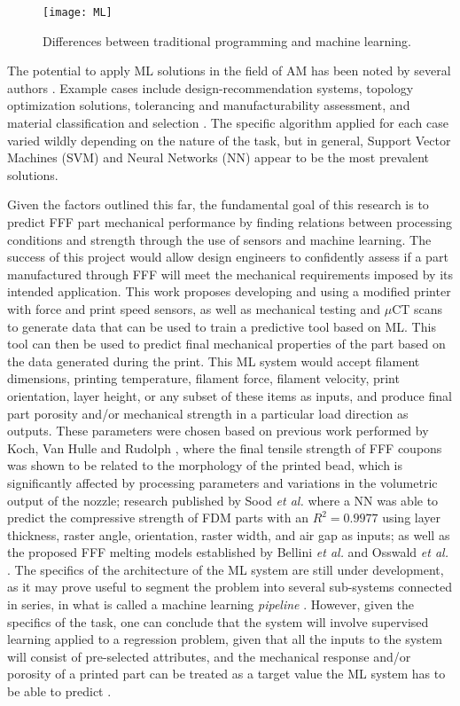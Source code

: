 \documentclass[main.tex]{subfiles}
\begin{document}
\begin{figure}[!htbp]
	\center
	\texttt{[image: ML]}
	\caption{Differences between traditional programming and machine learning. \cite{Chollet2018}} \label{fig:MLvsP}
\end{figure}

The potential to apply ML solutions in the field of AM has been noted by several authors \cite{Razvi2019,Meng2020}. Example cases include design-recommendation systems, topology optimization solutions, tolerancing and manufacturability assessment, and material classification and selection \cite{Razvi2019}. The specific algorithm applied for each case varied wildly depending on the nature of the task, but in general, Support Vector Machines (SVM) and Neural Networks (NN) appear to be the most prevalent solutions.

Given the factors outlined this far, the fundamental goal of this research is to predict FFF part mechanical performance by finding relations between processing conditions and strength through the use of sensors and machine learning. The success of this project would allow design engineers to confidently assess if a part manufactured through FFF will meet the mechanical requirements imposed by its intended application. This work proposes developing and using a modified printer with force and print speed sensors, as well as mechanical testing and $\mu$CT scans to generate data that can be used to train a predictive tool based on ML. This tool can then be used to predict final mechanical properties of the part based on the data generated during the print. This ML system would accept filament dimensions, printing temperature, filament force, filament velocity, print orientation, layer height, or any subset of these items as inputs, and produce final part porosity and/or mechanical strength in a particular load direction as outputs. These parameters were chosen based on previous work performed by Koch, Van Hulle and Rudolph \cite{Koch2017}, where the final tensile strength of FFF coupons was shown to be related to the morphology of the printed bead, which is significantly affected by processing parameters and variations in the volumetric output of the nozzle; research published by Sood \emph{et al.} \cite{Sood2012} where a NN was able to predict the compressive strength of FDM parts with an $R^2= 0.9977$ using layer thickness, raster angle, orientation, raster width, and air gap as inputs; as well as the proposed FFF melting models established by Bellini \emph{et al.} \cite{Bellini2004} and Osswald \emph{et al.} \cite{OsswaldMelting18}. The specifics of the architecture of the ML system are still under development, as it may prove useful to segment the problem into several sub-systems connected in series, in what is called a machine learning \emph{pipeline} \cite{Geron2019}. However, given the specifics of the task, one can conclude that the system will involve supervised learning applied to a regression problem, given that all the inputs to the system will consist of pre-selected attributes, and the mechanical response and/or porosity of a printed part can be treated as a target value the ML system has to be able to predict \cite{Mohammed2017, Meng2020}.
\end{document}

